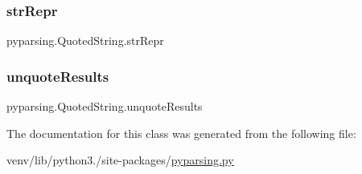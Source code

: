 \subsubsection{\texorpdfstring{str\+Repr}{strRepr}}
{\footnotesize\ttfamily pyparsing.\+Quoted\+String.\+str\+Repr}

\mbox{\label{classpyparsing_1_1QuotedString_a599c2949fc7459408cdb1583312502e3}} 
\subsubsection{\texorpdfstring{unquote\+Results}{unquoteResults}}
{\footnotesize\ttfamily pyparsing.\+Quoted\+String.\+unquote\+Results}



The documentation for this class was generated from the following file\+:\begin{DoxyCompactItemize}
\item 
venv/lib/python3./site-\/packages/\hyperlink{pyparsing_8py}{pyparsing.\+py}\end{DoxyCompactItemize}
